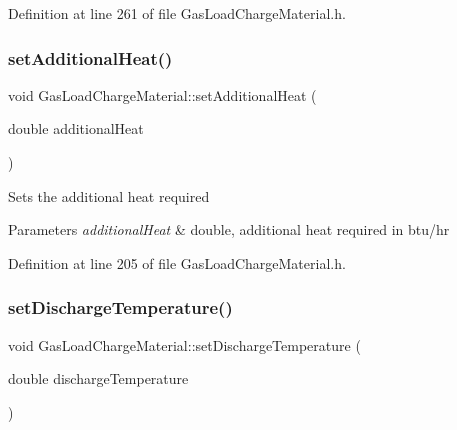 Definition at line 261 of file Gas\+Load\+Charge\+Material.\+h.

\mbox{\label{class_gas_load_charge_material_a08ef5196ea9919dfc71be6744c7da08e}} 
\subsubsection{\texorpdfstring{set\+Additional\+Heat()}{setAdditionalHeat()}}
{\footnotesize\ttfamily void Gas\+Load\+Charge\+Material\+::set\+Additional\+Heat (\begin{DoxyParamCaption}\item[{double}]{additional\+Heat }\end{DoxyParamCaption})\hspace{0.3cm}{\ttfamily [inline]}}

Sets the additional heat required 
\begin{DoxyParams}{Parameters}
{\em additional\+Heat} & double, additional heat required in btu/hr \\
\hline
\end{DoxyParams}


Definition at line 205 of file Gas\+Load\+Charge\+Material.\+h.

\mbox{\label{class_gas_load_charge_material_a6c53344d5370a1e9b7321a530a6843c0}} 
\subsubsection{\texorpdfstring{set\+Discharge\+Temperature()}{setDischargeTemperature()}}
{\footnotesize\ttfamily void Gas\+Load\+Charge\+Material\+::set\+Discharge\+Temperature (\begin{DoxyParamCaption}\item[{double}]{discharge\+Temperature }\end{DoxyParamCaption})\hspace{0.3cm}{\ttfamily [inline]}}

